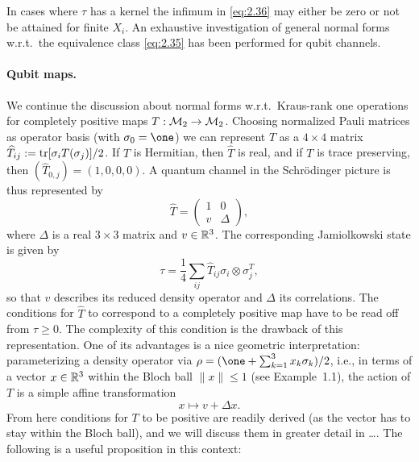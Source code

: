 \documentclass[11pt,a4paper]{article}
\numberwithin{equation}{section}
\theoremstyle{plain}
\theoremstyle{definition}
\begin{document}
    In cases where $\tau$ has a kernel the infimum in \eqref{eq:2.36} may either be zero
    or not be attained for finite $X_i$. An exhaustive investigation of general normal
    forms w.r.t.\ the equivalence class \eqref{eq:2.35} has been performed for qubit
    channels.

    \paragraph{Qubit maps.}
    We continue the discussion about normal forms w.r.t.\ Kraus-rank one operations for
    completely positive maps $T:\mathcal{M}_2 \to \mathcal{M}_2$. Choosing normalized Pauli matrices as
    operator basis (with $\sigma_0=\one$) we can represent $T$ as a $4\times 4$ matrix
$\widehat{T}_{ij} := \operatorname{tr}[\sigma_iT(\sigma_j)]/2$. If $T$ is Hermitian, then
$\widehat{T}$ is real, and if $T$ is trace preserving, then
$(\widehat{T}_{0,j})=(1,0,0,0)$. A quantum channel in the Schr\"odinger picture is
    thus represented by
    \begin{equation}\label{eq:2.38}
        \widehat{T} =
        \begin{pmatrix}
            1 &0\\
            v &\Delta
        \end{pmatrix},
    \end{equation}
    where $\Delta$ is a real $3\times 3$ matrix and $v\in \mathbb{R}^3$. The corresponding
    Jamiolkowski state is given by
    \[
        \tau = \frac{1}{4}\sum_{ij} \widehat{T}_{ij} \sigma_i\otimes \sigma_j^{T},
    \]
    so that $v$ describes its reduced density operator and $\Delta$ its correlations.
    The conditions for $\widehat{T}$ to correspond to a completely positive map have to
    be read off from $\tau\ge 0$. The complexity of this condition is the drawback of
    this representation. One of its advantages is a nice geometric interpretation:
    parameterizing a density operator via $\rho=(\one+\sum_{k=1}^3 x_k\sigma_k)/2$, i.e.,
    in terms of a vector $x\in \mathbb{R}^3$ within the Bloch ball $\|x\|\le 1$ (see
    Example~1.1), the action of $T$ is a simple affine transformation
    \begin{equation}\label{eq:2.39}
        x \mapsto v + \Delta x.
    \end{equation}
    From here conditions for $T$ to be positive are readily derived (as the vector has
    to stay within the Bloch ball), and we will discuss them in greater detail in
    \dots. The following is a useful proposition in this context:
\end{document}
